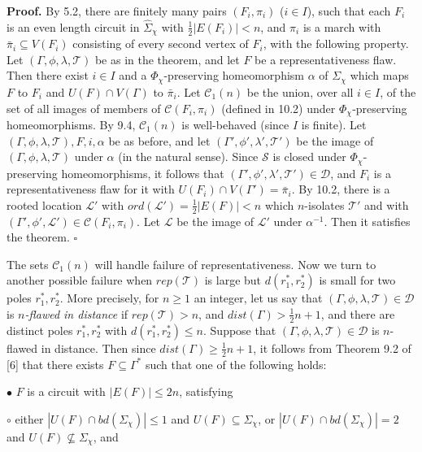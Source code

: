 \textbf{Proof.} By 5.2, there are finitely many pairs $(F_i, \pi_i)$ ($i \in I$), such that each $F_i$ is an even length circuit in $\hat{\Sigma}_\chi$ with $\frac{1}{2}|E(F_i)| < n$, and $\pi_i$ is a march with $\bar{\pi}_i \subseteq V(F_i)$ consisting of every second vertex of $F_i$, with the following property. Let $(\Gamma, \phi, \lambda, \mathscr{T})$ be as in the theorem, and let $F$ be a representativeness flaw. Then there exist $i \in I$ and a $\Phi_\chi$-preserving homeomorphism $\alpha$ of $\Sigma_\chi$ which maps $F$ to $F_i$ and $U(F) \cap V(\Gamma)$ to $\bar{\pi}_i$. Let $\mathscr{C}_1(n)$ be the union, over all $i \in I$, of the set of all images of members of $\mathscr{C}(F_i, \pi_i)$ (defined in 10.2) under $\Phi_\chi$-preserving homeomorphisms. By 9.4, $\mathscr{C}_1(n)$ is well-behaved (since $I$ is finite). Let $(\Gamma, \phi, \lambda, \mathscr{T}), F, i, \alpha$ be as before, and let $(\Gamma', \phi', \lambda', \mathscr{T}')$ be the image of $(\Gamma, \phi, \lambda, \mathscr{T})$ under $\alpha$ (in the natural sense). Since $\mathscr{S}$ is closed under $\Phi_\chi$-preserving homeomorphisms, it follows that $(\Gamma', \phi', \lambda', \mathscr{T}') \in \mathscr{D}$, and $F_i$ is a representativeness flaw for it with $U(F_i) \cap V(\Gamma') = \bar{\pi}_i$. By 10.2, there is a rooted location $\mathscr{L}'$ with $ord(\mathscr{L}') = \frac{1}{2}|E(F)| < n$ which $n$-isolates $\mathscr{T}'$ and with $(\Gamma', \phi', \mathscr{L}') \in \mathscr{C}(F_i, \pi_i)$. Let $\mathscr{L}$ be the image of $\mathscr{L}'$ under $\alpha^{-1}$. Then it satisfies the theorem. $\square$

The sets $\mathscr{C}_1(n)$ will handle failure of representativeness. Now we turn to another possible failure when $rep(\mathscr{T})$ is large but $d(r_1^*, r_2^*)$ is small for two poles $r_1^*, r_2^*$. More precisely, for $n \ge 1$ an integer, let us say that $(\Gamma, \phi, \lambda, \mathscr{T}) \in \mathscr{D}$ is \textit{$n$-flawed in distance} if $rep(\mathscr{T}) > n$, and $dist(\Gamma) > \frac{1}{2}n + 1$, and there are distinct poles $r_1^*, r_2^*$ with $d(r_1^*, r_2^*) \le n$. Suppose that $(\Gamma, \phi, \lambda, \mathscr{T}) \in \mathscr{D}$ is $n$-flawed in distance. Then since $dist(\Gamma) \ge \frac{1}{2}n + 1$, it follows from Theorem 9.2 of [6] that there exists $F \subseteq \Gamma^*$ such that one of the following holds:

\hspace*{12pt}$\bullet$ $F$ is a circuit with $|E(F)| \le 2n$, satisfying

\hspace*{24pt}$\circ$ either $|U(F) \cap bd(\Sigma_\chi)| \le 1$ and $U(F) \subseteq \Sigma_\chi$, or $|U(F) \cap bd(\Sigma_\chi)| = 2$ and $U(F) \not\subseteq \Sigma_\chi$, and
